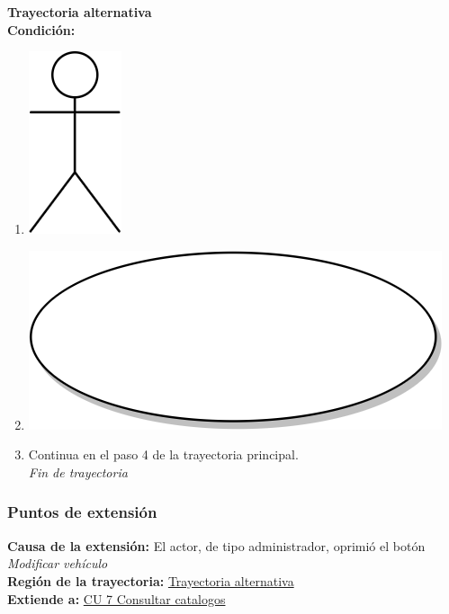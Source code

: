 \textbf{Trayectoria alternativa} \label{cu_ta_} \\
\textbf{Condición:} \\
 \begin{enumerate}[label=\arabic*]
    \item {\includegraphics[scale=.1]{Capitulo3/img/actor.png} }
    \item {\includegraphics[scale=.05]{Capitulo3/img/proceso.png}}
    \item {Continua en el paso 4 de la trayectoria principal.} \\
    \textit{Fin de trayectoria} \\
\end{enumerate}


\subsubsection{Puntos de extensión}
\noindent \textbf{Causa de la extensión:} El actor, de tipo administrador, oprimió el botón \textit{Modificar vehículo} \\
\textbf{Región de la trayectoria:} \hyperref[cu_ta_]{Trayectoria alternativa } \\
\textbf{Extiende a:} \hyperref[cu7]{CU 7 Consultar catalogos}
